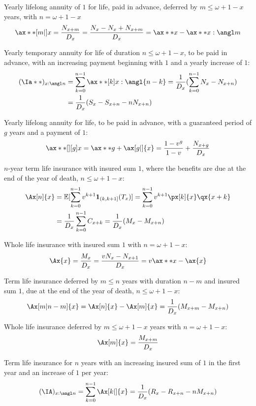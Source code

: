 \documentclass[11pt,a4paper,twoside]{article}
\begin{document}
Yearly lifelong annuity of \( 1 \) for life, paid in advance, deferred by \( m \leq \omega + 1 - x \) years,
with \( n = \omega + 1 - x \)
\[ \ax**[m|]{x} = \frac{N_{x+m}}{D_x} = \frac{N_x - N_x + N_{x+m}}{D_x} = \ax**{x} - \ax**{x:\angl m} \]

Yearly temporary annuity for life of duration \( n \leq \omega + 1 - x \), to be paid in advance, with
an increasing payment beginning with \( 1 \) and a yearly increase of \( 1 \):
\begin{align*}
  (\Ia**)_{x:\angl n} &= \sum_{k=0}^{n-1} \ax**[k]{x:\angl{n - k}} = \frac{1}{D_x}(\sum_{k=0}^{n-1} N_x - N_{x+n}) \\
                      &= \frac{1}{D_x}(S_x - S_{x+n} - n N_{x+n})
\end{align*}

Yearly lifelong annuity for life, to be paid in advance, with a guaranteed period of \( g \) years
and a payment of \( 1 \):
\[ \ax**[][g]{x} = \ax**{g} + \ax[g|]{x} = \frac{1 - v^g}{1 - v} + \frac{N_{x+g}}{D_x} \]

\( n \)-year term life insurance with insured sum \( 1 \), where the benefits are due at the end of
the year of death, \( n \leq \omega + 1 - x \):
\begin{align*} 
  \Ax[n]{x} &= \mathbb{E}[\sum_{k=0}^{n-1} v^{k+1} \mathbf{1}_{(k, k+1]}(T_x)] = \sum_{k=0}^{n-1} v^{k+1} \px[k]{x} \qx{x+k} \\
 &= \frac{1}{D_x} \sum_{k=0}^{n-1} C_{x+k} = \frac{1}{D_x}(M_x - M_{x+n}) 
\end{align*}

Whole life insurance with insured sum \( 1 \) with \( n = \omega + 1 - x \):
\[ \Ax{x} = \frac{M_x}{D_x} = \frac{vN_x - N_{x+1}}{D_x} = v \ax**{x} - \ax{x} \]

Term life insurance deferred by \( m \leq n \) years with duration \( n - m \) and insured sum \( 1 \),
due at the end of the year of death, \( n \leq \omega + 1 - x \):
\[ \Ax[m|n-m]{x} = \Ax[n]{x} - \Ax[m]{x} = \frac{1}{D_x}(M_{x+m} - M_{x+n}) \]

Whole life insurance deferred by \( m \leq \omega + 1 - x \) years with \( n = \omega + 1 - x \):
\[ \Ax[m]{x} = \frac{M_{x+m}}{D_x} \]

Term life insurance for \( n \) years with an increasing insured sum of \( 1 \) in the first year and
an increase of \( 1 \) per year:
\[ (\IA)_{x:\angl n} = \sum_{k=0}^{n-1} \Ax[k|]{x} = \frac{1}{D_x}(R_x - R_{x+n} - n M_{x+n}) \]
\end{document}
